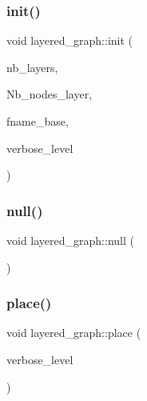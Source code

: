 \mbox{\label{classlayered__graph_a3d3422898f1e8d31eb937fcc460dbac2}} 
\subsubsection{\texorpdfstring{init()}{init()}}
{\footnotesize\ttfamily void layered\+\_\+graph\+::init (\begin{DoxyParamCaption}\item[{\mbox{\hyperlink{galois_8h_a09fddde158a3a20bd2dcadb609de11dc}{I\+NT}}}]{nb\+\_\+layers,  }\item[{\mbox{\hyperlink{galois_8h_a09fddde158a3a20bd2dcadb609de11dc}{I\+NT}} $\ast$}]{Nb\+\_\+nodes\+\_\+layer,  }\item[{const \mbox{\hyperlink{galois_8h_ab6cc7b4aeb6ea31aba2b3fbfc83ff5e6}{B\+Y\+TE}} $\ast$}]{fname\+\_\+base,  }\item[{\mbox{\hyperlink{galois_8h_a09fddde158a3a20bd2dcadb609de11dc}{I\+NT}}}]{verbose\+\_\+level }\end{DoxyParamCaption})}

\mbox{\label{classlayered__graph_a264acfdb2bbde82d82fc18f33adc9f35}} 
\subsubsection{\texorpdfstring{null()}{null()}}
{\footnotesize\ttfamily void layered\+\_\+graph\+::null (\begin{DoxyParamCaption}{ }\end{DoxyParamCaption})}

\mbox{\label{classlayered__graph_a5449ff3de184b379ed6986f6e78c8c4a}} 
\subsubsection{\texorpdfstring{place()}{place()}}
{\footnotesize\ttfamily void layered\+\_\+graph\+::place (\begin{DoxyParamCaption}\item[{\mbox{\hyperlink{galois_8h_a09fddde158a3a20bd2dcadb609de11dc}{I\+NT}}}]{verbose\+\_\+level }\end{DoxyParamCaption})}

